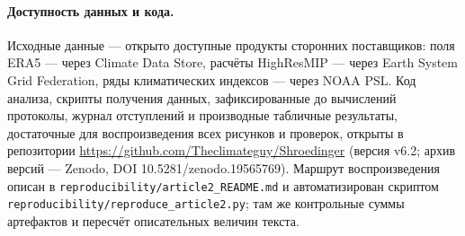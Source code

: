 \documentclass[11pt,a4paper]{article}
\begin{document}
\paragraph{Доступность данных и кода.} Исходные данные --- открыто доступные продукты сторонних поставщиков: поля ERA5 --- через Climate Data Store, расчёты HighResMIP --- через Earth System Grid Federation, ряды климатических индексов --- через NOAA PSL. Код анализа, скрипты получения данных, зафиксированные до вычислений протоколы, журнал отступлений и производные табличные результаты, достаточные для воспроизведения всех рисунков и проверок, открыты в репозитории \url{https://github.com/Theclimateguy/Shroedinger} (версия v6.2; архив версий --- Zenodo, DOI 10.5281/zenodo.19565769). Маршрут воспроизведения описан в \texttt{reproducibility/article2\_README.md} и автоматизирован скриптом \texttt{reproducibility/reproduce\_article2.py}; там же контрольные суммы артефактов и пересчёт описательных величин текста.

\printbibliography[title={Список литературы}]
\end{document}
